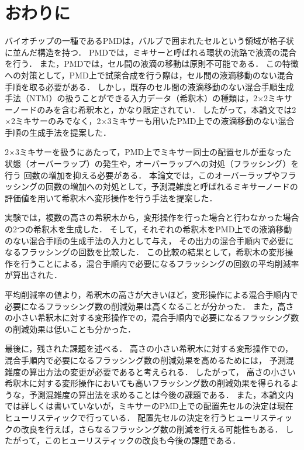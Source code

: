 \chapter{おわりに}
バイオチップの一種であるPMDは，バルブで囲まれたセルという領域が格子状に並んだ構造を持つ．
PMDでは，ミキサーと呼ばれる環状の流路で液滴の混合を行う．
また，PMDでは，セル間の液滴の移動は原則不可能である．
この特徴への対策として，PMD上で試薬合成を行う際は，セル間の液滴移動のない混合手順を取る必要がある．
しかし，既存のセル間の液滴移動のない混合手順生成手法（NTM）の扱うことができる入力データ（希釈木）の種類は，2$\times$2ミキサーノードのみを含む希釈木と，かなり限定されてい．
したがって，本論文では2$\times$2ミキサーのみでなく，2$\times$3ミキサーも用いたPMD上での液滴移動のない混合手順の生成手法を提案した．

2$\times$3ミキサーを扱うにあたって，PMD上でミキサー同士の配置セルが重なった状態（オーバーラップ）の発生や，オーバーラップへの対処（フラッシング）を行う
回数の増加を抑える必要がある．
本論文では，このオーバーラップやフラッシングの回数の増加への対処として，予測混雑度と呼ばれるミキサーノードの評価値を用いて希釈木へ変形操作を行う手法を提案した．

実験では，複数の高さの希釈木から，変形操作を行った場合と行わなかった場合の2つの希釈木を生成した．
そして，それぞれの希釈木をPMD上での液滴移動のない混合手順の生成手法の入力として与え，
その出力の混合手順内で必要になるフラッシングの回数を比較した．
この比較の結果として，希釈木の変形操作を行うことによる，混合手順内で必要になるフラッシングの回数の平均削減率が算出された．

平均削減率の値より，希釈木の高さが大きいほど，変形操作による混合手順内で必要になるフラッシング数の削減効果は高くなることが分かった．
また，高さの小さい希釈木に対する変形操作での，混合手順内で必要になるフラッシング数の削減効果は低いことも分かった．

最後に，残された課題を述べる．
高さの小さい希釈木に対する変形操作での，混合手順内で必要になるフラッシング数の削減効果を高めるためには，
予測混雑度の算出方法の変更が必要であると考えられる．
したがって，
高さの小さい希釈木に対する変形操作においても高いフラッシング数の削減効果を得られるような，予測混雑度の算出法を求めることは今後の課題である．
また，本論文内では詳しくは書いていないが，ミキサーのPMD上での配置先セルの決定は現在ヒューリスティックで行っている．
配置先セルの決定を行うヒューリスティックの改良を行えば，さらなるフラッシング数の削減を行える可能性もある．
したがって，このヒューリスティックの改良も今後の課題である．


